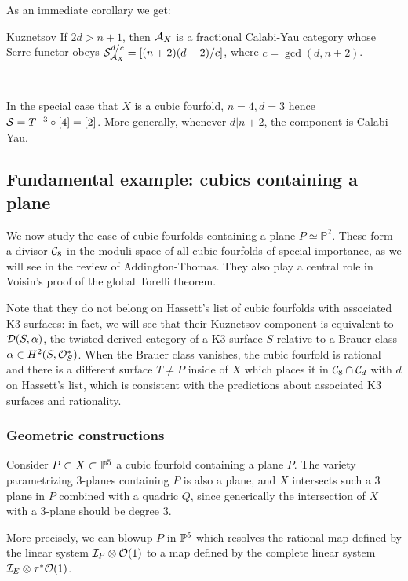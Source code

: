 As an immediate corollary we get:
\begin{corollary}{Kuznetsov}{}
    If $2d>n+1$, then $\calA_X$ is a fractional Calabi-Yau category whose Serre functor obeys $\calS_{\calA_X}^{d/c}=[(n+2)(d-2)/c]$, where $c=\gcd(d,n+2)$.

    ~

    In the special case that $X$ is a cubic fourfold, $n=4,d=3$ hence $\calS=T^{-3}\circ [4]=[2]$. More generally, whenever $d|n+2$, the component is Calabi-Yau.
\end{corollary}

\subsection{Fundamental example: cubics containing a plane}
We now study the case of cubic fourfolds containing a plane $P\simeq \mathbb{P}^2$. These form a divisor $\calC_8$ in the moduli space of all cubic fourfolds of special importance, as we will see in the review of Addington-Thomas. They also play a central role in Voisin's proof of the global Torelli theorem.

Note that they do not belong on Hassett's list of cubic fourfolds with associated K3 surfaces: in fact, we will see that their Kuznetsov component is equivalent to $\calD(S,\alpha)$, the twisted derived category of a K3 surface $S$ relative to a Brauer class $\alpha\in H^2(S, \O_S^*)$. When the Brauer class vanishes, the cubic fourfold is rational and there is a different surface $T\neq P$ inside of $X$ which places it in $\calC_8\cap \calC_d$ with $d$ on Hassett's list, which is consistent with the predictions about associated K3 surfaces and rationality.

\subsubsection{Geometric constructions}

Consider $P\subset X \subset \P^5$ a cubic fourfold containing a plane $P$. The variety parametrizing $3$-planes containing $P$ is also a plane, and $X$ intersects such a $3$ plane in $P$ combined with a quadric $Q$, since generically the intersection of $X$ with a 3-plane should be degree $3$.

More precisely, we can blowup $P$ in $\P^5$ which resolves the rational map defined by the linear system $\calI_P \otimes \O(1)$ to a map defined by the complete linear system $\calI_E \otimes \tau^*\O(1)$. 

